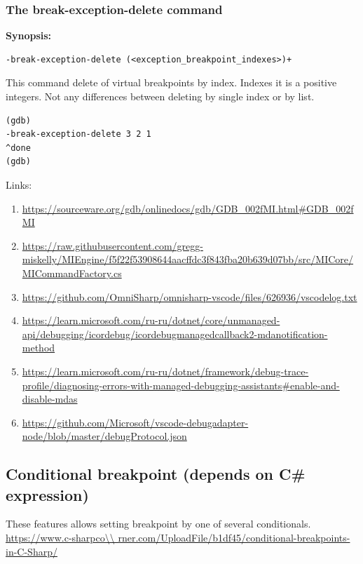 \documentclass[a4paper,12pt]{article}
\newenvironment{nobr}{\begin{minipage}{\textwidth}\setlength\parskip{1em}
}{\end{minipage}\ignorespacesafterend}
\begin{document}
\subsubsection{The break-exception-delete command}

\textbf{Synopsis:}

\begin{nobr}
\begin{lstlisting}[style=cplusplus,numbers=none]
-break-exception-delete (<exception_breakpoint_indexes>)+
\end{lstlisting}
\end{nobr}

This command delete of virtual breakpoints by index. Indexes it is a positive integers. Not any differences between deleting by single index or by list. 

\begin{nobr}
\begin{lstlisting}[style=cplusplus,title=\lstinline|Example|,numbers=none]
(gdb)
-break-exception-delete 3 2 1
^done
(gdb)
\end{lstlisting}
\end{nobr}

Links:
\begin{enumerate}
 \item \url{https://sourceware.org/gdb/onlinedocs/gdb/GDB_002fMI.html#GDB_002fMI}
 \item \url{https://raw.githubusercontent.com/gregg-miskelly/MIEngine/f5f22f53908644aacffdc3f843fba20b639d07bb/src/MICore/MICommandFactory.cs}
 \item \url{https://github.com/OmniSharp/omnisharp-vscode/files/626936/vscodelog.txt}
 \item \url{https://learn.microsoft.com/ru-ru/dotnet/core/unmanaged-api/debugging/icordebug/icordebugmanagedcallback2-mdanotification-method}
 \item \url{https://learn.microsoft.com/ru-ru/dotnet/framework/debug-trace-profile/diagnosing-errors-with-managed-debugging-assistants#enable-and-disable-mdas}
 \item \url{https://github.com/Microsoft/vscode-debugadapter-node/blob/master/debugProtocol.json}
\end{enumerate}

\subsection{Conditional breakpoint (depends on C\# expression)}

These features allows setting breakpoint by one of several conditionals. \url{https://www.c-sharpco\\
rner.com/UploadFile/b1df45/conditional-breakpoints-in-C-Sharp/}
\end{document}
